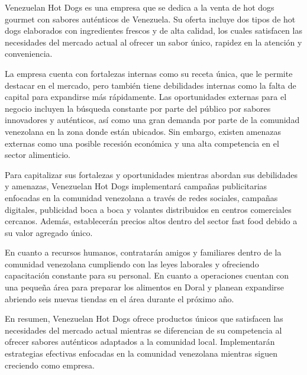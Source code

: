 Venezuelan Hot Dogs es una empresa que se dedica a la venta de hot dogs gourmet con sabores auténticos de Venezuela. Su oferta incluye dos tipos de hot dogs elaborados con ingredientes frescos y de alta calidad, los cuales satisfacen las necesidades del mercado actual al ofrecer un sabor único, rapidez en la atención y conveniencia.

La empresa cuenta con fortalezas internas como su receta única, que le permite destacar en el mercado, pero también tiene debilidades internas como la falta de capital para expandirse más rápidamente. Las oportunidades externas para el negocio incluyen la búsqueda constante por parte del público por sabores innovadores y auténticos, así como una gran demanda por parte de la comunidad venezolana en la zona donde están ubicados. Sin embargo, existen amenazas externas como una posible recesión económica y una alta competencia en el sector alimenticio.

Para capitalizar sus fortalezas y oportunidades mientras abordan sus debilidades y amenazas, Venezuelan Hot Dogs implementará campañas publicitarias enfocadas en la comunidad venezolana a través de redes sociales, campañas digitales, publicidad boca a boca y volantes distribuidos en centros comerciales cercanos. Además, establecerán precios altos dentro del sector fast food debido a su valor agregado único.

En cuanto a recursos humanos, contratarán amigos y familiares dentro de la comunidad venezolana cumpliendo con las leyes laborales y ofreciendo capacitación constante para su personal. En cuanto a operaciones cuentan con una pequeña área para preparar los alimentos en Doral y planean expandirse abriendo seis nuevas tiendas en el área durante el próximo año.

En resumen, Venezuelan Hot Dogs ofrece productos únicos que satisfacen las necesidades del mercado actual mientras se diferencian de su competencia al ofrecer sabores auténticos adaptados a la comunidad local. Implementarán estrategias efectivas enfocadas en la comunidad venezolana mientras siguen creciendo como empresa.